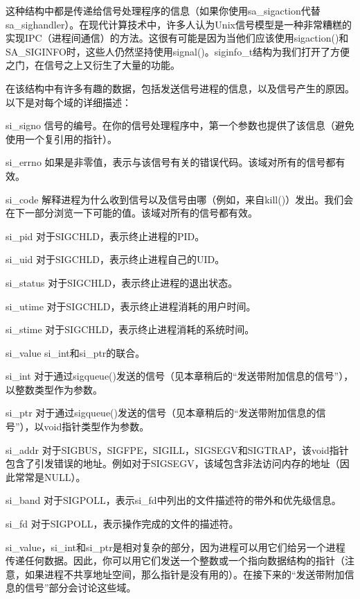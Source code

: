 这种结构中都是传递给信号处理程序的信息（如果你使用sa\_sigaction代替sa\_sighandler）。在现代计算技术中，许多人认为Unix信号模型是一种非常糟糕的实现IPC（进程间通信）的方法。这很有可能是因为当他们应该使用sigaction()和SA\_SIGINFO时，这些人仍然坚持使用signal()。siginfo\_t结构为我们打开了方便之门，在信号之上又衍生了大量的功能。

在该结构中有许多有趣的数据，包括发送信号进程的信息，以及信号产生的原因。以下是对每个域的详细描述：

\begin{eqlist*}
\item[si\_signo] 信号的编号。在你的信号处理程序中，第一个参数也提供了该信息（避免使用一个复引用的指针）。
\item[si\_errno] 如果是非零值，表示与该信号有关的错误代码。该域对所有的信号都有效。
\item[si\_code] 解释进程为什么收到信号以及信号由哪（例如，来自kill()）发出。我们会在下一部分浏览一下可能的值。该域对所有的信号都有效。
\item[si\_pid] 对于SIGCHLD，表示终止进程的PID。
\item[si\_uid] 对于SIGCHLD，表示终止进程自己的UID。
\item[si\_status] 对于SIGCHLD，表示终止进程的退出状态。
\item[si\_utime] 对于SIGCHLD，表示终止进程消耗的用户时间。
\item[si\_stime] 对于SIGCHLD，表示终止进程消耗的系统时间。
\item[si\_value] si\_int和si\_ptr的联合。
\item[si\_int] 对于通过sigqueue()发送的信号（见本章稍后的“发送带附加信息的信号”），以整数类型作为参数。
\item[si\_ptr] 对于通过sigqueue()发送的信号（见本章稍后的“发送带附加信息的信号”），以void指针类型作为参数。
\item[si\_addr] 对于SIGBUS，SIGFPE，SIGILL，SIGSEGV和SIGTRAP，该void指针包含了引发错误的地址。例如对于SIGSEGV，该域包含非法访问内存的地址（因此常常是NULL）。
\item[si\_band] 对于SIGPOLL，表示si\_fd中列出的文件描述符的带外和优先级信息。
\item[si\_fd] 对于SIGPOLL，表示操作完成的文件的描述符。
\end{eqlist*}

si\_value，si\_int和si\_ptr是相对复杂的部分，因为进程可以用它们给另一个进程传递任何数据。因此，你可以用它们发送一个整数或一个指向数据结构的指针（注意，如果进程不共享地址空间，那么指针是没有用的）。在接下来的“发送带附加信息的信号”部分会讨论这些域。

